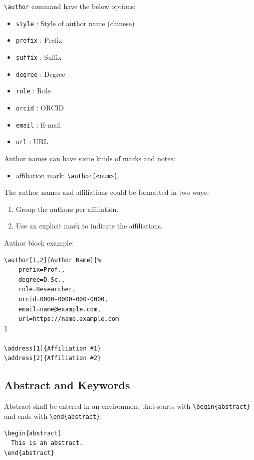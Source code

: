 \documentclass[
]{ceurart}
\begin{document}
\verb|\author|
command have the below options:
\begin{itemize}
\item \verb|style| : Style of author name (chinese)
\item \verb|prefix| : Prefix
\item \verb|suffix| : Suffix
\item \verb|degree| : Degree
\item \verb|role| : Role
\item \verb|orcid| : ORCID
\item \verb|email| : E-mail
\item \verb|url| : URL
\end{itemize}

Author names can have some kinds of marks and notes:
\begin{itemize}
\item affiliation mark: \verb|\author[<num>]|.
\end{itemize}

The author names and affiliations could be formatted in two ways:
\begin{enumerate}
\item Group the authors per affiliation.
\item Use an explicit mark to indicate the affiliations.
\end{enumerate}

Author block example:
\begin{lstlisting}[language={[latex]TeX}]
\author[1,2]{Author Name}[%
    prefix=Prof.,
    degree=D.Sc.,
    role=Researcher,
    orcid=0000-0000-000-0000,
    email=name@example.com,
    url=https://name.example.com
]

\address[1]{Affiliation #1}
\address[2]{Affiliation #2}
\end{lstlisting}

\subsection{Abstract and Keywords}

Abstract shall be entered in an environment that starts with \verb|\begin{abstract}| and ends with \verb|\end{abstract}|.

\begin{lstlisting}[language={[latex]TeX}]
\begin{abstract}
  This is an abstract.
\end{abstract}
\end{lstlisting}
\end{document}
